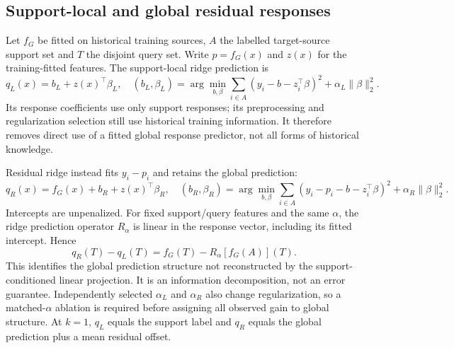 \documentclass[11pt]{article}
\begin{document}
\subsection{Support-local and global residual responses}
Let $f_G$ be fitted on historical training sources, $A$ the labelled target-source support set and $T$ the disjoint query set. Write $p=f_G(x)$ and $z(x)$ for the training-fitted features. The support-local ridge prediction is
\begin{equation}
q_L(x)=b_L+z(x)^\top\beta_L,\quad
(b_L,\beta_L)=\arg\min_{b,\beta}\sum_{i\in A}(y_i-b-z_i^\top\beta)^2+\alpha_L\|\beta\|_2^2.
\end{equation}
Its response coefficients use only support responses; its preprocessing and regularization selection still use historical training information. It therefore removes direct use of a fitted global response predictor, not all forms of historical knowledge.

Residual ridge instead fits $y_i-p_i$ and retains the global prediction:
\begin{equation}
q_R(x)=f_G(x)+b_R+z(x)^\top\beta_R,\quad
(b_R,\beta_R)=\arg\min_{b,\beta}\sum_{i\in A}(y_i-p_i-b-z_i^\top\beta)^2+\alpha_R\|\beta\|_2^2.
\end{equation}
Intercepts are unpenalized. For fixed support/query features and the same $\alpha$, the ridge prediction operator $R_\alpha$ is linear in the response vector, including its fitted intercept. Hence
\begin{equation}\label{eq:identity}
q_R(T)-q_L(T)=f_G(T)-R_\alpha[f_G(A)](T).
\end{equation}
This identifies the global prediction structure not reconstructed by the support-conditioned linear projection. It is an information decomposition, not an error guarantee. Independently selected $\alpha_L$ and $\alpha_R$ also change regularization, so a matched-$\alpha$ ablation is required before assigning all observed gain to global structure. At $k=1$, $q_L$ equals the support label and $q_R$ equals the global prediction plus a mean residual offset.
\end{document}
